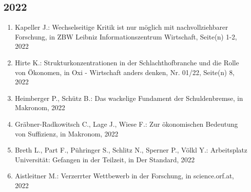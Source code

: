 \subsection*{2022}
\begin{enumerate}
    	 \item Kapeller J.: Wechselseitige Kritik ist nur möglich mit nachvollziehbarer Forschung, in ZBW Leibniz Informationszentrum Wirtschaft, Seite(n) 1-2, 2022
	 \item Hirte K.: Strukturkonzentrationen in der Schlachthofbranche und die Rolle von Ökonomen, in Oxi - Wirtschaft anders denken, Nr. 01/22, Seite(n) 8, 2022
	 \item Heimberger P., Schütz B.: Das wackelige Fundament der Schuldenbremse, in Makronom, 2022
	 \item Gräbner-Radkowitsch C., Lage J., Wiese F.: Zur ökonomischen Bedeutung von Suffizienz, in Makronom, 2022
	 \item Breth L., Part F., Pühringer S., Schlitz N., Sperner P., Völkl Y.: Arbeitsplatz Universität: Gefangen in der Teilzeit, in Der Standard, 2022
	 \item Aistleitner M.: Verzerrter Wettbewerb in der Forschung, in science.orf.at, 2022
\end{enumerate}
